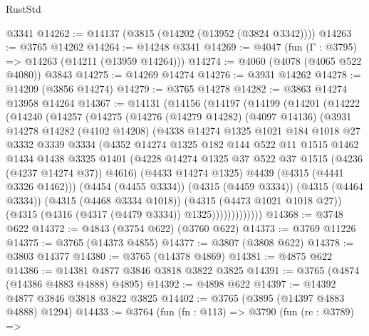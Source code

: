 \begin{lexlean}{RustStd}
\begin{coremodule}
    @3341
@14262 := @14137 (@3815 (@14202 (@13952 (@3824 @3342))))
@14263 := @3765 @14262
@14264 := @14248 @3341
@14269 := @4047 (fun (Γ : @3795) => @14263 (@14211 (@13959 @14264)))
@14274 := @4060 (@4078 (@4065 @522 @4080)) @3843
@14275 := @14269 @14274
@14276 := @3931 @14262
@14278 := @14209 (@3856 @14274)
@14279 := @3765 @14278
@14282 := @3863 @14274 @13958 @14264
@14367 := @14131
    (@14156
      (@14197
        (@14199
          (@14201
            (@14222
              (@14240
                (@14257
                  (@14275
                    (@14276
                      (@14279 @14282)
                      (@4097 @14136)
                      (@3931
                        @14278
                        @14282
                        (@4102 @14208)
                        (@4338
                          @14274
                          @1325
                          @1021
                          @184
                          @1018
                          @27
                          @3332
                          @3339
                          @3334
                          (@4352
                            @14274
                            @1325
                            @182
                            @144
                            @522
                            @11
                            @1515
                            @1462
                            @1434
                            @1438
                            @3325
                            @1401
                            (@4228 @14274 @1325 @37 @522 @37 @1515 (@4236 (@4237 @14274 @37)) @4616)
                            (@4433 @14274 @1325)
                            @4439
                            (@4315 (@4441 @3326 @1462)))
                          (@4454 (@4455 @3334))
                          (@4315 (@4459 @3334))
                          (@4315 (@4464 @3334))
                          (@4315 (@4468 @3334 @1018))
                          (@4315 (@4473 @1021 @1018 @27))
                          (@4315 (@4316 (@4317 (@4479 @3334)) @1325)))))))))))))
@14368 := @3748 @622
@14372 := @4843 (@3754 @622) (@3760 @622)
@14373 := @3769 @11226
@14375 := @3765 (@14373 @4855)
@14377 := @3807 (@3808 @622)
@14378 := @3803 @14377
@14380 := @3765 (@14378 @4869)
@14381 := @4875 @622
@14386 := @14381 @4877 @3846 @3818 @3822 @3825
@14391 := @3765 (@4874 (@14386 @4883 @4888) @4895)
@14392 := @4898 @622
@14397 := @14392 @4877 @3846 @3818 @3822 @3825
@14402 := @3765 (@3895 (@14397 @4883 @4888) @1294)
@14433 := @3764
    (fun (fn : @113) =>
    @3790
      (fun (rc : @3789) =>

\end{coremodule}
\end{lexlean}
